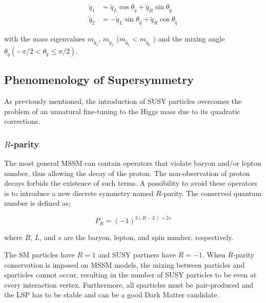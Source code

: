 				\begin{align}
					\tilde{q}_1 & = \tilde{q}_L \cos \theta_{\tilde{q}} + \tilde{q}_R \sin \theta_{\tilde{q}} \\
					\tilde{q}_2 & = - \tilde{q}_L \sin \theta_{\tilde{q}} + \tilde{q}_R \cos \theta_{\tilde{q}}
				\end{align}
				
				\noindent with the mass eigenvalues $m_{\tilde{q}_1}$, $m_{\tilde{q}_2}$ ($m_{\tilde{q}_1} < m_{\tilde{q}_2}$ ) and the mixing angle $\theta_{\tilde{q}} \left (- \pi / 2 < \theta_{\tilde{q}} \leq \pi / 2 \right )$. 
				


		\subsection{Phenomenology of Supersymmetry}
		\label{sec:SUSYPheno}

			As previously mentioned, the introduction of \ac{SUSY} particles overcomes the problem of an unnatural fine-tuning to the Higgs mass due to its quadratic corrections.%

			\subsubsection*{$R$-parity}
				
				The most general \ac{MSSM} can contain operators that violate baryon and/or lepton number, thus allowing the decay of the proton. The non-observation of proton decays forbids the existence of such terms. A possibility to avoid these operators is to introduce a new discrete symmetry named $R$-parity. The conserved quantum number is defined as;

				\begin{equation}
					P_R = \left ( -1 \right )^{3 \left (B - L \right )+ 2s}
				\end{equation}

				\noindent where $B$, $L$, and $s$ are the baryon, lepton, and spin number, respectively.	

				The \ac{SM} particles have $R = 1$ and \ac{SUSY} partners have $R=-1$. When $R$-parity conservation is imposed on \ac{MSSM} models, the mixing between particles and sparticles cannot occur, resulting in the number of \ac{SUSY} particles to be even at every interaction vertex. Furthermore, all sparticles must be pair-produced and the \ac{LSP} has to be stable and can be a good Dark Matter candidate. %

